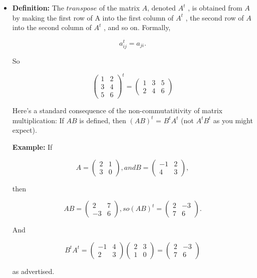 \documentclass{book}
\begin{document}
\begin{itemize}
\item \textbf{Definition:} The $transpose$ of the matrix $A$, denoted $A^t$ , is obtained from $A$ by making the first row of A into the first column of $A^t$ , the second row of $A$ into the second column of $A^t$ , and so on. Formally,

	$$a^t_{ij} = a_{ji} . $$

So

						$$\begin{pmatrix} 1 & 2 \\ 3 & 4 \\ 5 & 6 \end{pmatrix}^t = \begin{pmatrix} 1 & 3 & 5 \\ 2 & 4 & 6 \end{pmatrix}$$

Here\rq s a standard consequence of the non-commutatitivity of matrix multiplication: If $AB$ is defined, then $(AB)^t$ = $B^tA^t$ (not $A^tB^t$ as you might expect).

						\textbf{Example:} If

						$$A = \begin{pmatrix} 2 & 1 \\ 3 & 0 \end{pmatrix}, and B = \begin{pmatrix} -1 & 2 \\ 4 & 3\end{pmatrix}, $$

then

						$$ AB = \begin{pmatrix} 2 & 7 \\ -3 & 6 \end{pmatrix}, so (AB)^t = \begin{pmatrix} 2 & -3 \\ 7 & 6 \end{pmatrix}. $$

And

	$$ B^tA^t = \begin{pmatrix}-1 & 4 \\ 2 & 3 \end{pmatrix} \begin{pmatrix} 2 & 3 \\ 1 & 0 \end{pmatrix} = \begin{pmatrix} 2 & -3 \\ 7 & 6\end{pmatrix} $$

as advertised.


\end{itemize}
\end{document}
